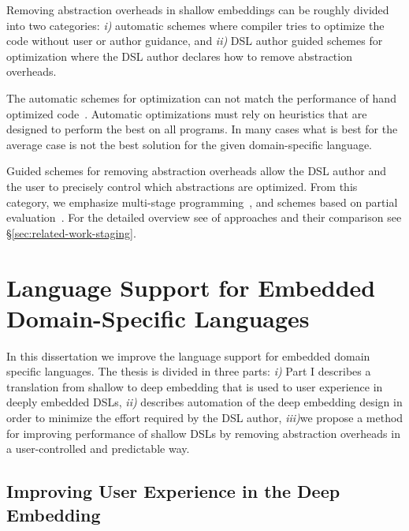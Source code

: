 Removing abstraction overheads in shallow embeddings can be roughly
 divided into two categories: \emph{i)} automatic schemes where compiler tries
 to optimize the code without user or author guidance, and \emph{ii)} DSL author
 guided schemes for optimization where the DSL author declares how to remove
 abstraction overheads.

The automatic schemes for optimization can not match the performance of hand optimized
 code~\cite{rompf_optimizing_2013}. Automatic optimizations must rely on heuristics that
 are designed to perform the best on all programs. In many cases what is best for the
 average case is not the best solution for the given domain-specific language.

Guided schemes for removing abstraction overheads allow the DSL author and the user
to precisely control which abstractions are optimized. From this category, we emphasize
multi-stage programming~\cite{taha_multi-stage_1997,taha2004gentle}, and schemes
based on partial evaluation~\cite{jones1993partial,brady2010scrapping}. For the detailed
overview see of approaches and their comparison see \S \ref{sec:related-work-staging}.

\section{Language Support for Embedded Domain-Specific Languages}
\label{sec:improving-language-support}

In this dissertation we improve the language support for embedded domain specific languages. The
 thesis is divided in three parts: \emph{i)} Part I describes a translation from shallow to deep embedding that is used to user experience in deeply embedded DSLs, \emph{ii)} describes automation of the deep embedding design in order to minimize the effort required by the DSL author, \emph{iii)}we propose a method for improving performance of shallow DSLs by removing abstraction overheads in a user-controlled and predictable way.

\subsection{Improving User Experience in the Deep Embedding}
\label{sec:user-experience}

